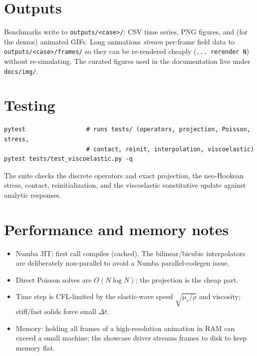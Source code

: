 \documentclass[11pt]{article}
\begin{document}
\section{Outputs}
Benchmarks write to \texttt{outputs/<case>/}: CSV time series, PNG figures, and
(for the demos) animated GIFs. Long animations \emph{stream} per-frame field data to
\texttt{outputs/<case>/frames/} so they can be re-rendered cheaply
(\texttt{... rerender N}) without re-simulating. The curated figures used in the
documentation live under \texttt{docs/img/}.

\section{Testing}
\begin{lstlisting}[style=sh]
pytest                 # runs tests/ (operators, projection, Poisson, stress,
                       # contact, reinit, interpolation, viscoelastic)
pytest tests/test_viscoelastic.py -q
\end{lstlisting}
The suite checks the discrete operators and exact projection, the neo-Hookean
stress, contact, reinitialization, and the viscoelastic constitutive update against
analytic responses.

\section{Performance and memory notes}
\begin{itemize}[nosep]
  \item Numba JIT: first call compiles (cached). The bilinear/bicubic interpolators
  are deliberately non-parallel to avoid a Numba parallel-codegen issue.
  \item Direct Poisson solves are $O(N\log N)$; the projection is the cheap part.
  \item Time step is CFL-limited by the elastic-wave speed $\sqrt{\mu_s/\rho}$ and
  viscosity; stiff/fast solids force small $\Delta t$.
  \item Memory: holding all frames of a high-resolution animation in RAM can exceed
  a small machine; the showcase driver streams frames to disk to keep memory flat.
\end{itemize}
\end{document}
